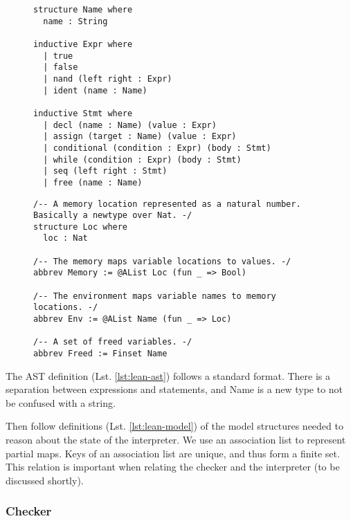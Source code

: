 \begin{figure}[!h]
  \begin{minipage}{0.53\textwidth}
    \centering
    \begin{lstlisting}[language=lean,caption={AST structures defined in Lean},label={lst:lean-ast},frame=none]
structure Name where
  name : String

inductive Expr where
  | true
  | false
  | nand (left right : Expr)
  | ident (name : Name)

inductive Stmt where
  | decl (name : Name) (value : Expr)
  | assign (target : Name) (value : Expr)
  | conditional (condition : Expr) (body : Stmt)
  | while (condition : Expr) (body : Stmt)
  | seq (left right : Stmt)
  | free (name : Name)
\end{lstlisting}
  \end{minipage}
  \begin{minipage}{0.47\textwidth}
    \centering
    \begin{lstlisting}[language=lean,caption={Definition of models in Lean},label={lst:lean-model},frame=none,escapechar=*]
/-- A memory location represented as a natural number. Basically a newtype over Nat. -/
structure Loc where
  loc : Nat

/-- The memory maps variable locations to values. -/
abbrev Memory := @AList Loc (fun _ => Bool)

/-- The environment maps variable names to memory locations. -/
abbrev Env := @AList Name (fun _ => Loc)

/-- A set of freed variables. -/
abbrev Freed := Finset Name
\end{lstlisting}
  \end{minipage}
\end{figure}

The AST definition (Lst. \ref{lst:lean-ast}) follows a standard format. There is a separation between expressions and statements, and Name is a new type to not be confused with a string.

Then follow definitions (Lst. \ref{lst:lean-model}) of the model structures needed to reason about the state of the interpreter. We use an association list to represent partial maps. Keys of an association list are unique, and thus form a finite set. This relation is important when relating the checker and the interpreter (to be discussed shortly).

\subsubsection{Checker}

